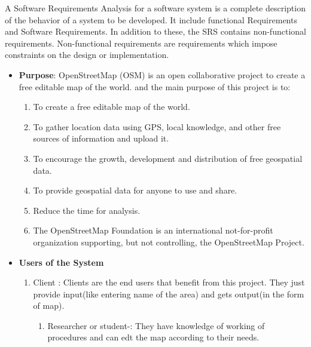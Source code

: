 

A Software Requirements Analysis for a software system is a complete 
description of the behavior of a system to be developed. It include functional Requirements
and Software Requirements. In addition to these, the SRS contains 
non-functional requirements. Non-functional requirements are 
requirements which impose constraints on the design or implementation.
\begin{itemize}
\item{\bf Purpose}: OpenStreetMap (OSM) is an open collaborative project to  create a free editable map of the world. and the main purpose of this project is to:
\begin{enumerate}
\item  To  create a free editable map of the world.
\item To gather location data  using GPS, local knowledge, and other free sources of information and upload it.
\item  To encourage the growth, development and distribution of free geospatial data. 
\item  To provide geospatial data for anyone to use and share.
\item Reduce the time for analysis.
\item The OpenStreetMap Foundation is an international not-for-profit organization supporting, but not controlling, the OpenStreetMap Project.
\end{enumerate}

\item{\bf Users of the System}
\begin{enumerate} 
\item Client : Clients are the end users that benefit from this project.
They just provide input(like entering name of the area) and gets output(in the form of map).
\begin{enumerate}
\item Researcher or student-: They have knowledge of working of procedures and can edt the map according to their needs.  
\end{enumerate}
\end{enumerate}
\end{itemize}

